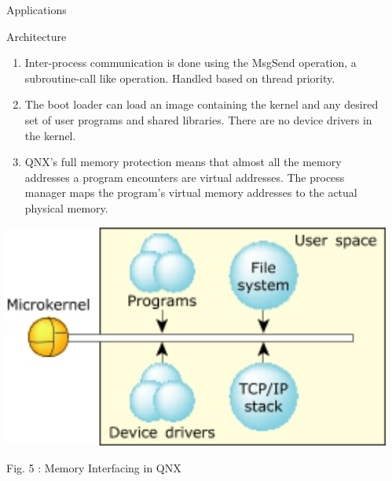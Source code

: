 \documentclass[final]{beamer}
\newlength{\sepwid}
\newlength{\onecolwid}
\newlength{\twocolwid}
\begin{document}
\begin{frame}[t]
\begin{columns}[t]
\begin{column}{\twocolwid}
\begin{columns}[t,totalwidth=\twocolwid]
\begin{column}{\onecolwid}
\begin{block}{Applications}
\end{block}

\begin{block}{Architecture}
    \begin{enumerate}
\item Inter-process communication is done using the MsgSend operation, a subroutine-call like operation. Handled based on thread priority.
\item The boot loader can load an image containing the kernel and any desired set of user programs and shared libraries. There are no device drivers in the kernel.

\item QNX's full memory protection means that almost all the memory addresses a program encounters are virtual addresses. The process manager maps the program's virtual memory addresses to the actual physical memory.
\end{enumerate}

\vspace{10mm}
\vfill

\begin{center}
 \includegraphics[width=23cm]{qnx_mem.jpg}
 \vspace{5mm}
\vfill
 \caption{Fig. 5 : Memory Interfacing in QNX}
\end{center}

\end{block}

\end{column} %

\end{columns} %

\end{column} %

\begin{column}{\sepwid}\end{column} %


\end{columns}
\end{frame}
\end{document}
